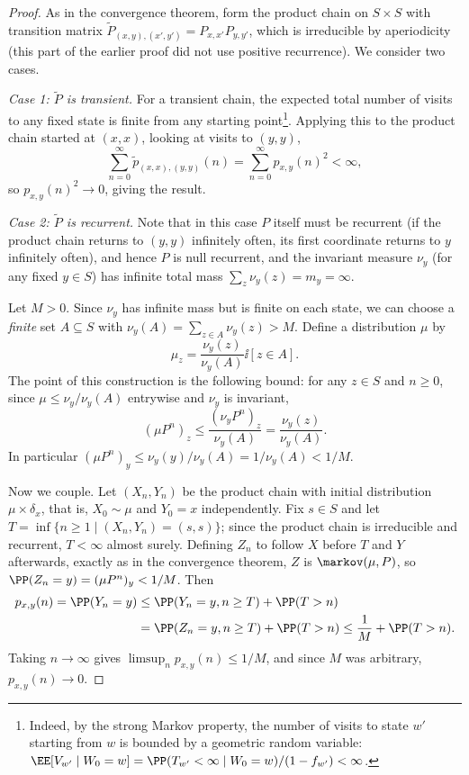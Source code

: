 \begin{proof}
	As in the convergence theorem, form the product chain on $S \times S$ with transition matrix $\widetilde{P}_{(x, y), (x', y')} = P_{x, x'}P_{y, y'}$, which is irreducible by aperiodicity (this part of the earlier proof did not use positive recurrence). We consider two cases.

	\emph{Case 1: $\widetilde{P}$ is transient.} For a transient chain, the expected total number of visits to any fixed state is finite from any starting point\footnote{Indeed, by the strong Markov property, the number of visits to state $w'$ starting from $w$ is bounded by a geometric random variable: $\EE[V_{w'} \mid W_0 = w] = \PP(T_{w'} < \infty \mid W_0 = w)/(1 - f_{w'}) < \infty$.}. Applying this to the product chain started at $(x, x)$, looking at visits to $(y, y)$,
	$$
	\sum_{n = 0}^{\infty} \widetilde{p}_{(x,x), (y,y)}(n) = \sum_{n = 0}^{\infty} p_{x, y}(n)^2 < \infty,
	$$
	so $p_{x, y}(n)^2 \rightarrow 0$, giving the result.

	\emph{Case 2: $\widetilde{P}$ is recurrent.} Note that in this case $P$ itself must be recurrent (if the product chain returns to $(y, y)$ infinitely often, its first coordinate returns to $y$ infinitely often), and hence $P$ is null recurrent, and the invariant measure $\nu_y$ (for any fixed $y \in S$) has infinite total mass $\sum_z \nu_y(z) = m_y = \infty$.

	Let $M > 0$. Since $\nu_y$ has infinite mass but is finite on each state, we can choose a \emph{finite} set $A \subseteq S$ with $\nu_y(A) = \sum_{z \in A}\nu_y(z) > M$. Define a distribution $\mu$ by
	$$
	\mu_z = \frac{\nu_y(z)}{\nu_y(A)} \ii[z \in A].
	$$
	The point of this construction is the following bound: for any $z \in S$ and $n \geq 0$, since $\mu \leq \nu_y / \nu_y(A)$ entrywise and $\nu_y$ is invariant,
	$$
	(\mu P^n)_z \leq \frac{(\nu_y P^n)_z}{\nu_y(A)} = \frac{\nu_y(z)}{\nu_y(A)}.
	$$
	In particular $(\mu P^n)_y \leq \nu_y(y)/\nu_y(A) = 1/\nu_y(A) < 1/M$.

	Now we couple. Let $(X_n, Y_n)$ be the product chain with initial distribution $\mu \times \delta_x$, that is, $X_0 \sim \mu$ and $Y_0 = x$ independently. Fix $s \in S$ and let $T = \inf\{n \geq 1 \mid (X_n, Y_n) = (s, s)\}$; since the product chain is irreducible and recurrent, $T < \infty$ almost surely. Defining $Z_n$ to follow $X$ before $T$ and $Y$ afterwards, exactly as in the convergence theorem, $Z$ is $\markov(\mu, P)$, so $\PP(Z_n = y) = (\mu P^n)_y < 1/M$. Then
	\begin{align*}
	p_{x, y}(n) = \PP(Y_n = y) &\leq \PP(Y_n = y, n \geq T) + \PP(T > n) \\
	&= \PP(Z_n = y, n \geq T) + \PP(T > n) \leq \frac{1}{M} + \PP(T > n).
	\end{align*}
	Taking $n \to \infty$ gives $\limsup_n p_{x, y}(n) \leq 1/M$, and since $M$ was arbitrary, $p_{x, y}(n) \rightarrow 0$.
\end{proof}

